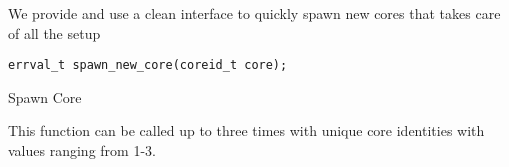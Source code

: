 We provide and use a clean interface to quickly spawn new cores that takes care of all the setup
\begin{code}

\begin{mdframed}[style=myframe]
\begin{verbatim}
errval_t spawn_new_core(coreid_t core);
\end{verbatim}
\end{mdframed}
\caption{Spawn Core}
\label{code:spawn_core}
\newline
\end{code}
This function can be called up to three times with unique core identities with values ranging from 1-3.